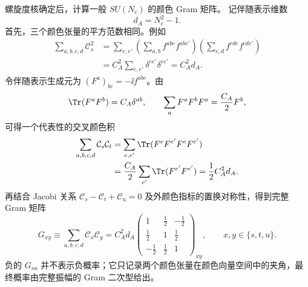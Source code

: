 \begin{derivation}[胶子散射的颜色与偏振求和]
螺旋度核确定后，计算一般 $SU(N_c)$ 的颜色 Gram 矩阵。
记伴随表示维数
\begin{equation*}
 d_A=N_c^2-1.
\end{equation*}
首先，三个颜色张量的平方范数相同。例如
\begin{align*}
 \sum_{a,b,c,d}\mathcal C_s^2
 &=\sum_{e,e'}
 \left(\sum_{a,b}f^{abe}f^{ab e'}\right)
 \left(\sum_{c,d}f^{cde}f^{cd e'}\right)\\
 &=C_A^2\sum_{e,e'}\delta^{ee'}\delta^{ee'}
 =C_A^2d_A.
\end{align*}
令伴随表示生成元为 $(F^a)_{bc}=-\ii f^{abc}$。由
\begin{equation*}
 \Tr(F^aF^b)=C_A\delta^{ab},
 \qquad
 \sum_aF^aF^bF^a=\frac{C_A}{2}F^b,
\end{equation*}
可得一个代表性的交叉颜色积
\begin{align*}
 \sum_{a,b,c,d}\mathcal C_s\mathcal C_t
 &=\sum_{e,e'}\Tr(F^eF^{e'}F^eF^{e'})\\
 &=\frac{C_A}{2}\sum_{e'}\Tr(F^{e'}F^{e'})
 =\frac12C_A^2d_A.
\end{align*}
再结合 Jacobi 关系 $\mathcal C_s-\mathcal C_t+\mathcal C_u=0$ 及外颜色指标的置换对称性，得到完整 Gram 矩阵
\begin{equation*}
 G_{xy}\equiv\sum_{a,b,c,d}\mathcal C_x\mathcal C_y
 =C_A^2d_A
 \begin{pmatrix}
 1&\tfrac12&-\tfrac12\\
 \tfrac12&1&\tfrac12\\
 -\tfrac12&\tfrac12&1
 \end{pmatrix}_{xy},
 \qquad x,y\in\{s,t,u\}.
\end{equation*}
负的 $G_{su}$ 并不表示负概率；它只记录两个颜色张量在颜色向量空间中的夹角，最终概率由完整振幅的 Gram 二次型给出。


\end{derivation}
